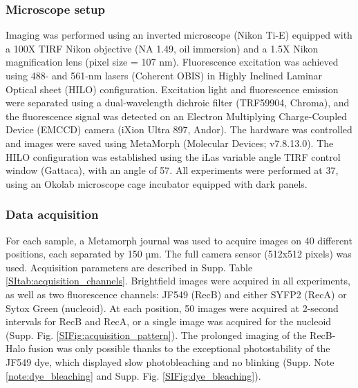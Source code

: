 \subsubsection*{Microscope setup}
Imaging was performed using an inverted microscope (Nikon Ti-E) equipped with a 100X TIRF Nikon objective (NA 1.49, oil immersion) and a 1.5X Nikon magnification lens (pixel size = 107 nm). Fluorescence excitation was achieved using 488- and 561-nm lasers (Coherent OBIS) in Highly Inclined Laminar Optical sheet (HILO) configuration. Excitation light and fluorescence emission were separated using a dual-wavelength dichroic filter (TRF59904, Chroma), and the fluorescence signal was detected on an Electron Multiplying Charge-Coupled Device (EMCCD) camera (iXion Ultra 897, Andor). The hardware was controlled and images were saved using MetaMorph (Molecular Devices; v7.8.13.0). The HILO configuration was established using the iLas variable angle TIRF control window (Gattaca), with an angle of 57\degree. All experiments were performed at 37\celsius, using an Okolab microscope cage incubator equipped with dark panels.

\subsubsection*{Data acquisition}
For each sample, a Metamorph journal was used to acquire images on 40 different positions, each separated by 150 µm. The full camera sensor (512x512 pixels) was used. Acquisition parameters are described in Supp. Table \ref{SItab:acquisition_channels}. Brightfield images were acquired in all experiments, as well as two fluorescence channels: JF549 (RecB) and either SYFP2 (RecA) or Sytox Green (nucleoid). At each position, 50 images were acquired at 2-second intervals for RecB and RecA, or a single image was acquired for the nucleoid (Supp. Fig. \ref{SIFig:acquisition_pattern}). The prolonged imaging of the RecB-Halo fusion was only possible thanks to the exceptional photostability of the JF549 dye, which displayed slow photobleaching and no blinking (Supp. Note \ref{note:dye_bleaching} and Supp. Fig. \ref{SIFig:dye_bleaching}).

